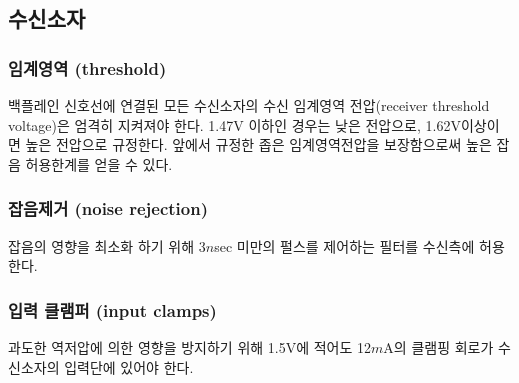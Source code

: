 \subsection{수신소자}
%
\subsubsection{임계영역 (threshold)}
%
백플레인 신호선에 연결된 모든 수신소자의 수신 임계영역 전압(receiver threshold
voltage)은 엄격히 지켜져야 한다. 1.47V 이하인 경우는 낮은 전압으로,
1.62V이상이면 높은 전압으로 규정한다.
앞에서 규정한 좁은 임계영역전압을 보장함으로써 높은 잡음 허용한계를 얻을 수 있다.

\subsubsection{잡음제거 (noise rejection)}
%
잡음의 영향을 최소화 하기 위해 3$n$sec 미만의 펄스를 제어하는 필터를 수신측에 허용한다.

\subsubsection{입력 클램퍼 (input clamps)}
%
과도한 역저압에 의한 영향을 방지하기 위해 1.5V에 적어도 12$m$A의 클램핑 회로가
수신소자의 입력단에 있어야 한다.
%

